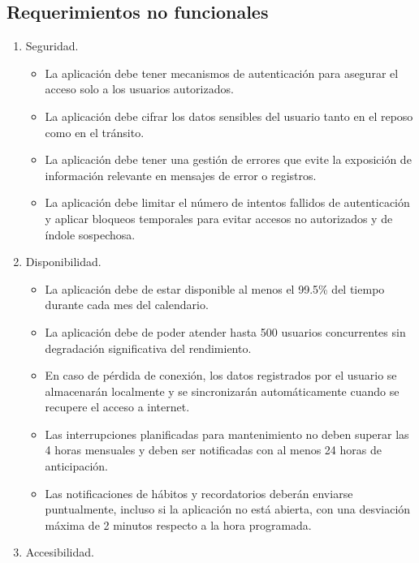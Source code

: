 \documentclass[letterpaper,12pt,oneside]{article}
\begin{document}
        \subsection{Requerimientos no funcionales}
            \begin{enumerate}
                \item Seguridad.
                    \begin{itemize}
                        \item La aplicación debe tener mecanismos de autenticación para asegurar el acceso solo a los usuarios autorizados.
                        \item La aplicación debe cifrar los datos sensibles del usuario tanto en el reposo como en el tránsito.
                        \item La aplicación debe tener una gestión de errores que evite la exposición de información relevante en mensajes de error o registros.
                        \item La aplicación debe limitar el número de intentos fallidos de autenticación y aplicar bloqueos temporales para evitar accesos no autorizados y de índole sospechosa.
                    \end{itemize}
                \item Disponibilidad.
                    \begin{itemize}
                        \item La aplicación debe de estar disponible al menos el 99.5\% del tiempo durante cada mes del calendario.
                        \item La aplicación debe de poder atender hasta 500 usuarios concurrentes sin degradación significativa del rendimiento.
                        \item En caso de pérdida de conexión, los datos registrados por el usuario se almacenarán localmente y se sincronizarán automáticamente cuando se recupere el acceso a internet.
                        \item Las interrupciones planificadas para mantenimiento no deben superar las 4 horas mensuales y deben ser notificadas con al menos 24 horas de anticipación.
                        \item Las notificaciones de hábitos y recordatorios deberán enviarse puntualmente, incluso si la aplicación no está abierta, con una desviación máxima de 2 minutos respecto a la hora programada.
                    \end{itemize}
                \item Accesibilidad.

\end{enumerate}
\end{document}
